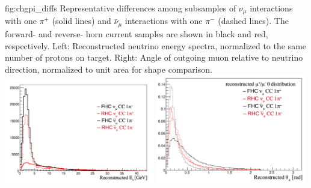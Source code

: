 \begin{dunefigure}{fig:chgpi_diffs}
{Representative differences among subsamples of  $\nu_{\mu}$ interactions with one $\pi^+$ (solid lines) and  $\bar{\nu}_{\mu}$ interactions with one $\pi^-$ (dashed lines). The forward- and reverse- horn current samples are shown in black and red, respectively. Left: Reconstructed neutrino energy spectra, normalized to the same number of protons on target. Right: Angle of outgoing muon relative to neutrino direction, normalized to unit area for shape comparison.}
    \includegraphics[width=0.49\textwidth]{graphics/Ereco_numu_1pi.png}
    \includegraphics[width=0.49\textwidth]{graphics/mu_theta_numu_6.png}
\end{dunefigure}

